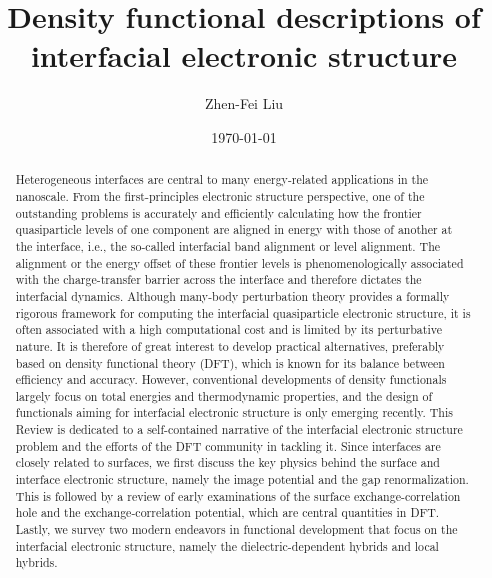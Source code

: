 \documentclass[aip, amsmath, amssymb, reprint, longbibliography]{revtex4-2}
\begin{document}
\title{Density functional descriptions of interfacial electronic structure}
\author{Zhen-Fei Liu}

\date{\today}

\begin{abstract}
Heterogeneous interfaces are central to many energy-related applications in the nanoscale. From the first-principles electronic structure perspective, one of the outstanding problems is accurately and efficiently calculating how the frontier quasiparticle levels of one component are aligned in energy with those of another at the interface, i.e., the so-called interfacial band alignment or level alignment. The alignment or the energy offset of these frontier levels is phenomenologically associated with the charge-transfer barrier across the interface and therefore dictates the interfacial dynamics. Although many-body perturbation theory provides a formally rigorous framework for computing the interfacial quasiparticle electronic structure, it is often associated with a high computational cost and is limited by its perturbative nature. It is therefore of great interest to develop practical alternatives, preferably based on density functional theory (DFT), which is known for its balance between efficiency and accuracy. However, conventional developments of density functionals largely focus on total energies and thermodynamic properties, and the design of functionals aiming for interfacial electronic structure is only emerging recently. This Review is dedicated to a self-contained narrative of the interfacial electronic structure problem and the efforts of the DFT community in tackling it. Since interfaces are closely related to surfaces, we first discuss the key physics behind the surface and interface electronic structure, namely the image potential and the gap renormalization. This is followed by a review of early examinations of the surface exchange-correlation hole and the exchange-correlation potential, which are central quantities in DFT. Lastly, we survey two modern endeavors in functional development that focus on the interfacial electronic structure, namely the dielectric-dependent hybrids and local hybrids.
\end{abstract}

\maketitle
\end{document}
